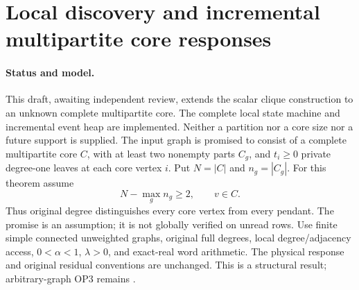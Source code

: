 \section[Local multipartite core responses]{Local discovery and incremental multipartite core responses}
\label{sec:op3-local-multipartite}

\paragraph{Status and model.}
This \statusproved{} draft, awaiting independent review, extends the scalar
clique construction to an unknown complete multipartite core. The complete
local state machine and incremental event heap are implemented. Neither a
partition nor a core size nor a future support is supplied. The input graph
is promised to consist of a complete multipartite core $C$, with at least
two nonempty parts $C_g$, and $t_i\geq0$ private degree-one leaves at each
core vertex $i$. Put $N=|C|$ and $n_g=|C_g|$. For this theorem assume
\begin{equation}
 N-\max_g n_g\geq2,\qquad v\in C.
 \label{eq:op3-multipartite-promise}
\end{equation}
Thus original degree distinguishes every core vertex from every pendant.
The promise is an assumption; it is not globally verified on unread rows.
Use finite simple connected unweighted graphs, original full degrees,
local degree/adjacency access, $0<\alpha<1$, $\lambda>0$, and exact-real
word arithmetic. The physical response and original residual conventions
are unchanged. This is a structural result; arbitrary-graph OP3 remains
\statusopen{}.

